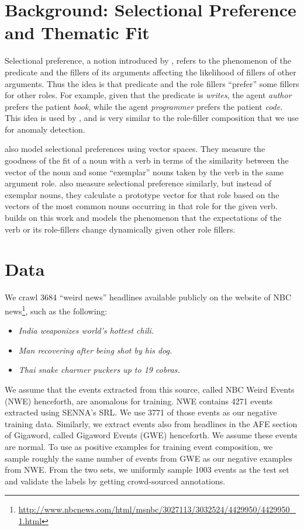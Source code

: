 \section{Background: Selectional Preference and Thematic Fit}
Selectional preference, a notion introduced by \cite{wilks1973preference}, refers to the phenomenon 
of the predicate and the fillers of its arguments
affecting the likelihood of fillers of other arguments.  Thus the idea is that predicate and the role fillers 
``prefer'' some fillers for other roles.  For example, given that the predicate is \textit{writes}, the 
agent \textit{author} prefers the patient \textit{book}, while the agent \textit{programmer} prefers the 
patient \textit{code}.  This idea is used by \cite{elman2009meaning}, and is very similar to the 
role-filler composition that we use for anomaly detection.

\cite{erk2010flexible} also model selectional preferences using vector spaces.  They measure the 
goodness of the fit of a noun with a verb in terms of the similarity between the vector of the noun and 
some ``exemplar'' nouns taken by the verb in the same argument role.  \cite{baroni2010distributional} 
also measure selectional preference similarly, but instead of exemplar nouns, they calculate a 
prototype vector for that role based on the vectors of the most common nouns occurring in that 
role for the given verb.  \cite{lenci2011composing} builds on this work and models the phenomenon
that the expectations of the verb or its role-fillers change dynamically given other role fillers.

\section{Data}
We crawl 3684 ``weird news'' headlines available publicly 
on the website of NBC
news\footnote{\url{
http://www.nbcnews.com/html/msnbc/3027113/3032524/4429950/4429950_1.html}}, 
such as the following: 
\begin{itemize}
 \item \textit{India weaponizes world's hottest chili.}
 \item \textit{Man recovering after being shot by his dog.}
 \item \textit{Thai snake charmer puckers up to 19 cobras.}
\end{itemize}
We assume that the events extracted from this source, called NBC Weird Events
(NWE) henceforth, are
anomalous for training.  NWE contains 4271 events extracted using 
SENNA's SRL.  We use 3771 of those events as our negative training data. 
Similarly, we extract events also from
headlines in the AFE section of Gigaword, called Gigaword Events (GWE)
henceforth.  We assume these events are normal.
To use as positive examples for training event composition, we sample roughly
the same number of events from 
GWE as our negative examples from NWE. From the two sets, we uniformly sample 1003 events
as the test set and validate the labels by getting crowd-sourced annotations.

